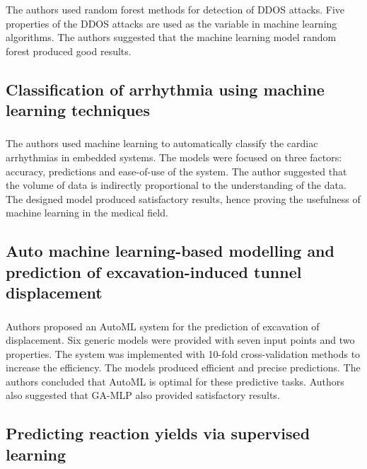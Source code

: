 The authors used random forest methods for detection of DDOS attacks. Five properties of the DDOS attacks are used as the variable in machine learning algorithms. The authors suggested that the machine learning model random forest produced good results.

\subsection{Classification of arrhythmia using machine learning techniques}
\subsubsection{\citeauthor*{ref_paper_4} \citeyearpar{ref_paper_4}}

The authors used machine learning to automatically classify the cardiac arrhythmias in embedded systems. The models were focused on three factors: accuracy, predictions and ease-of-use of the system. The author suggested that the volume of data is indirectly proportional to the understanding of the data. The designed model produced satisfactory results, hence proving the usefulness of machine learning in the medical field.

\subsection{Auto machine learning-based modelling and prediction of excavation-induced tunnel displacement}
\subsubsection{\citeauthor*{ref_paper_1} \citeyearpar{ref_paper_1}}

Authors proposed an AutoML system for the prediction of excavation of displacement. Six generic models were provided with seven input points and two properties. The system was implemented with 10-fold cross-validation methods to increase the efficiency. The models produced efficient and precise predictions. The authors concluded that AutoML is optimal for these predictive tasks. Authors also suggested that GA-MLP also provided satisfactory results.

\subsection{Predicting reaction yields via supervised learning}
\subsubsection{\citeauthor*{ref_paper_10} \citeyearpar{ref_paper_10}}

